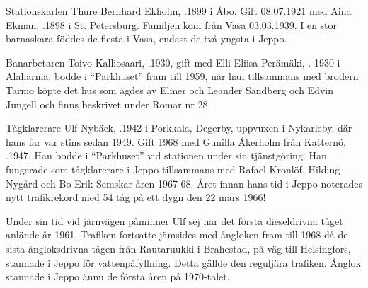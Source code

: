 {Stationskarlen Thure Bernhard Ekholm, .1899 i Åbo. Gift 08.07.1921 med Aina Ekman, .1898 i St. Petersburg. Familjen kom från Vasa 03.03.1939. I en stor barnaskara föddes de flesta i Vasa, endast de två yngsta i Jeppo.
\begin{jhchildren}
  \item {}
  \item {}
  \item {}
  \item {}
  \item {}
  \item {}
  \item {}
  \item {}
  \item {}
  \item {}
  \item {}
\end{jhchildren}

Banarbetaren Toivo Kalliosaari, .1930, gift med Elli Eliisa Perämäki, . 1930 i Alahärmä, bodde i ``Parkhuset'' fram till 1959, när han tillsammans med brodern Tarmo köpte det hus som ägdes av Elmer och Leander Sandberg och Edvin Jungell och finns beskrivet under Romar nr 28.


Tågklarerare Ulf Nybäck, .1942 i Porkkala, Degerby, uppvuxen i Nykarleby, där hans far var stins sedan 1949. Gift 1968 med Gunilla Åkerholm från Katternö, .1947. Han bodde i ``Parkhuset'' vid stationen under sin tjänstgöring. Han fungerade som tågklarerare i Jeppo tillsammans med Rafael Kronlöf, Hilding Nygård och Bo Erik Semskar åren 1967-68. Året innan hans tid i Jeppo noterades nytt trafikrekord med 54 tåg på ett dygn den 22 mars 1966!

Under sin tid vid järnvägen påminner Ulf sej när det första dieseldrivna tåget anlände år 1961. Trafiken fortsatte jämsides med ångloken fram till 1968 då de sista ångloksdrivna tågen från Rautaruukki i Brahestad, på väg till Helsingfors, stannade i Jeppo för vattenpåfyllning. Detta gällde den reguljära trafiken. Ånglok stannade i Jeppo ännu de första åren på 1970-talet.

}

